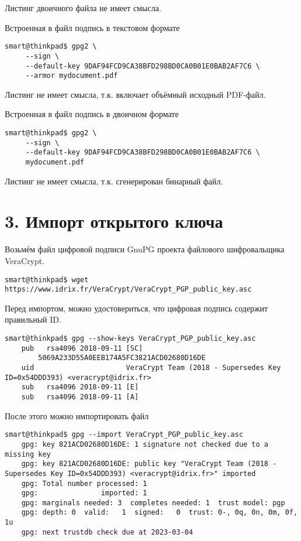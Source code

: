 Листинг двоичного файла не имеет смысла.

Встроенная в файл подпись в текстовом формате

\begin{Verbatim}[frame=single]
    smart@thinkpad$ gpg2 \
     --sign \
     --default-key 9DAF94FCD9CA38BFD298BD0CA0B01E0BAB2AF7C6 \
     --armor mydocument.pdf
\end{Verbatim}

Листинг не имеет смысла, т.к. включает объёмный исходный PDF-файл.

Встроенная в файл подпись в двоичном формате

\begin{Verbatim}[frame=single]
    smart@thinkpad$ gpg2 \
     --sign \
     --default-key 9DAF94FCD9CA38BFD298BD0CA0B01E0BAB2AF7C6 \
     mydocument.pdf
\end{Verbatim}

Листинг не имеет смысла, т.к. сгенерирован бинарный файл.

\section*{3. Импорт открытого ключа}

Возьмём файл цифровой подписи GnuPG проекта файлового шифровальщика VeraCrypt.

\begin{Verbatim}[frame=single]
    smart@thinkpad$ wget https://www.idrix.fr/VeraCrypt/VeraCrypt_PGP_public_key.asc
\end{Verbatim}

Перед импортом, можно удостовериться, что цифровая подпись содержит правильный ID.
\begin{Verbatim}[frame=single]
    smart@thinkpad$ gpg --show-keys VeraCrypt_PGP_public_key.asc
    pub   rsa4096 2018-09-11 [SC]
        5069A233D55A0EEB174A5FC3821ACD02680D16DE
    uid                      VeraCrypt Team (2018 - Supersedes Key ID=0x54DDD393) <veracrypt@idrix.fr>
    sub   rsa4096 2018-09-11 [E]
    sub   rsa4096 2018-09-11 [A]
\end{Verbatim}

После этого можно импортировать файл
\begin{Verbatim}[frame=single]
    smart@thinkpad$ gpg --import VeraCrypt_PGP_public_key.asc 
    gpg: key 821ACD02680D16DE: 1 signature not checked due to a missing key
    gpg: key 821ACD02680D16DE: public key "VeraCrypt Team (2018 - Supersedes Key ID=0x54DDD393) <veracrypt@idrix.fr>" imported
    gpg: Total number processed: 1
    gpg:               imported: 1
    gpg: marginals needed: 3  completes needed: 1  trust model: pgp
    gpg: depth: 0  valid:   1  signed:   0  trust: 0-, 0q, 0n, 0m, 0f, 1u
    gpg: next trustdb check due at 2023-03-04
\end{Verbatim}

